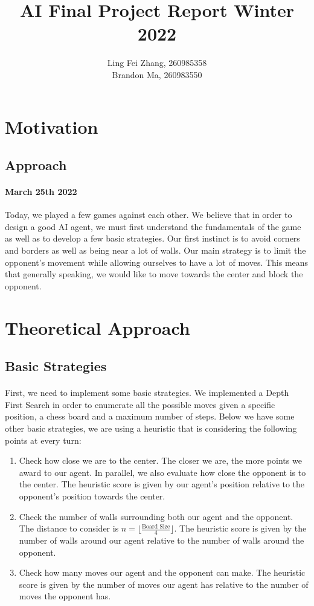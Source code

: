\documentclass[12pt,a4paper]{article}
\author{Ling Fei Zhang, 260985358\\
Brandon Ma, 260983550}
\begin{document}
\title{AI Final Project Report Winter 2022}    
\maketitle


\section{Motivation}
\subsection{Approach}
\paragraph{March 25th 2022}
Today, we played a few games against each other. We believe that in order to design a good AI agent, 
we must first understand the fundamentals of the game as well as to develop a few basic strategies. 
Our first instinct is to avoid 
corners and borders as well as being near a lot of walls. Our main strategy is to limit the opponent's 
movement while allowing ourselves to have a lot of moves. This means that generally speaking, we would 
like to move towards the center and block the opponent. 


\section{Theoretical Approach}
\subsection{Basic Strategies}
\paragraph{} First, we need to implement some basic strategies. We implemented a Depth First Search in order to enumerate 
all the possible moves given a specific position, a chess board and a maximum number of steps. Below we 
have some other basic strategies, we are using a heuristic that is considering the following points at every turn:
\begin{enumerate}
    \item Check how close we are to the center. The closer we are, the more points we award to our agent. 
    In parallel, we also evaluate how close the opponent is to the center. The heuristic score is given by 
    our agent's position relative to the opponent's position towards the center. 
    \item  Check the number of walls surrounding both our agent and the opponent. The distance to consider 
    is $n = \lfloor\frac{\text{Board Size}}{4}\rfloor$. The heuristic score is given by 
    the number of walls around our agent relative to the number of 
    walls around the opponent. 
    \item Check how many moves our agent and the opponent can make. The heuristic score is given by the 
    number of moves our agent has relative to the number of moves the opponent has. 
\end{enumerate}
\end{document}
